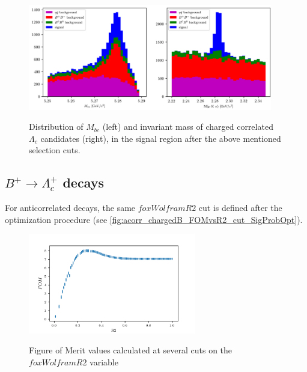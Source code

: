 \begin{figure}[h!]
{\includegraphics[width=0.95\textwidth]{03-Selection/figs/Mbc_InvM_optimizedSelection_SigR.png}}
\caption{Distribution of $M_{bc} $ (left) and invariant mass of charged correlated $\Lambda_c$  candidates (right), in the signal region after the above mentioned selection cuts.}
\label{fig:Mbc_InvM_optimizedSelection_SigR}
\end{figure}

\subsection{$B^+ \rightarrow \Lambda_c^+$ decays}
\label{sec:chargedAntiBtoLambdaC}

For anticorrelated decays, the same  $foxWolframR2$ cut is defined after the optimization procedure (see \cref{fig:acorr_chargedB_FOMvsR2_cut_SigProbOpt}).

\begin{figure}[h!]
    {\includegraphics[width=0.65\textwidth]{03-Selection/figs/acorr_chargedB_FOMvsR2_cut.png}}
    \caption{Figure of Merit values calculated at several cuts on the $foxWolframR2$ variable}
    \label{fig:acorr_chargedB_FOMvsR2_cut}
    \end{figure}


